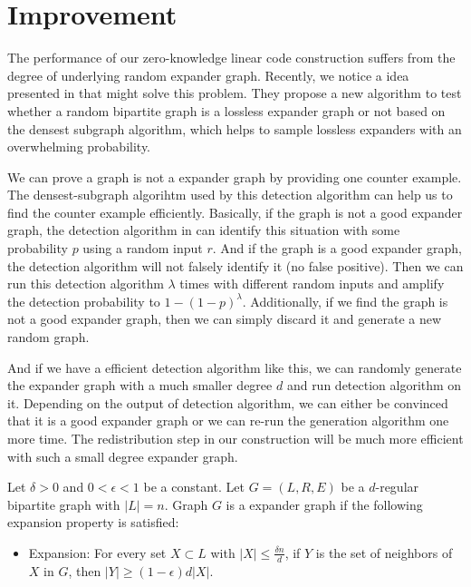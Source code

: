 \section{Improvement}

The performance of our zero-knowledge linear code construction suffers from the degree of underlying random expander graph. Recently, we notice a idea presented in \cite{orion} that might solve this problem. They propose a new algorithm to test whether a random bipartite graph is a lossless expander graph or not based on the densest subgraph algorithm, which helps to sample lossless expanders with an overwhelming probability.

We can prove a graph is not a expander graph by providing one counter example. The densest-subgraph algorihtm used by this detection algorithm can help us to find the counter example efficiently.
Basically, if the graph is not a good expander graph, the detection algorithm in \cite{orion} can identify this situation with some probability $p$ using a random input $r$. And if the graph is a good expander graph, the detection algorithm will not falsely identify it (no false positive). Then we can run this detection algorithm $\lambda$ times with different random inputs and amplify the detection probability to $1 - (1 - p)^\lambda$. Additionally, if we find the graph is not a good expander graph, then we can simply discard it and generate a new random graph.


And if we have a efficient detection algorithm like this, we can randomly generate the expander graph with a much smaller degree $d$ and run detection algorithm on it. Depending on the output of detection algorithm, we can either be convinced that it is a good expander graph or we can re-run the generation algorithm one more time. The redistribution step in our construction will be much more efficient with such a small degree expander graph.


\begin{definition}
\label{definition:randomgraph2}

Let $\delta > 0$ and $0 < \epsilon < 1$ be a constant. Let $G=(L, R, E)$ be a $d$-regular bipartite graph with $|L| = n$. Graph $G$ is a expander graph if the following expansion property is satisfied:

    \begin{itemize}
        \item Expansion: For every set $X \subset L$ with $|X| \le \frac{\delta n}{d}$, if $Y$ is the set of neighbors of $X$ in $G$, then $|Y| \ge (1 - \epsilon) d |X|$.
    \end{itemize}

\end{definition}

